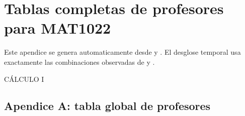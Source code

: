\clearpage

\appendix

\section{Tablas completas de profesores para MAT1022}

Este apendice se genera automaticamente desde  y . El desglose temporal usa exactamente las combinaciones observadas de  y .

CÁLCULO I

\subsection{Apendice A: tabla global de profesores}


